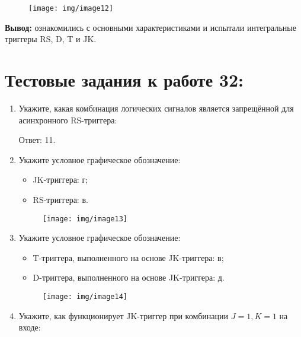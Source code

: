 \documentclass[spec, och, labwork]{shiza}
\begin{document}
\begin{figure}[H]
    \centering
    \texttt{[image: img/image12]}
    \caption{}
\end{figure}

\textbf{Вывод:} ознакомились с основными характеристиками и испытали интегральные триггеры RS, D, T и JK.

\section{Тестовые задания к работе 32:}

\begin{enumerate}
    \item Укажите, какая комбинация логических сигналов является запрещённой для асинхронного RS-триггера:
    
        Ответ: 11.

    \item Укажите условное графическое обозначение:
        
        \begin{itemize}
            \item JK-триггера: г;
            \item RS-триггера: в.
        \end{itemize}
    
        \begin{figure}[H]
            \centering
            \texttt{[image: img/image13]}
            \caption{}
        \end{figure}

    \item Укажите условное графическое обозначение:
    
        \begin{itemize}
            \item T-триггера, выполненного на основе JK-триггера: в;
            \item D-триггера, выполненного на основе JK-триггера: д.
        \end{itemize}

        \begin{figure}[H]
            \centering
            \texttt{[image: img/image14]}
            \caption{}
        \end{figure}

    \item Укажите, как функционирует JK-триггер при комбинации $J = 1, K = 1$ на входе:
    

\end{enumerate}
\end{document}
